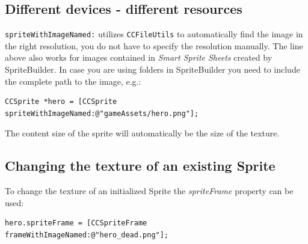 \subsection{Different devices - different resources}

\texttt{spriteWithImageNamed:} utilizes \texttt{CCFileUtils} to
automatically find the image in the right resolution, you do not have to
specify the resolution manually. The line above also works for images
contained in \emph{Smart Sprite Sheets} created by SpriteBuilder. In
case you are using folders in SpriteBuilder you need to include the
complete path to the image, e.g.:

\begin{verbatim}
CCSprite *hero = [CCSprite spriteWithImageNamed:@"gameAssets/hero.png"];
\end{verbatim}

The content size of the sprite will automatically be the size of the
texture.

\subsection{Changing the texture of an existing
Sprite}\label{changing-the-texture-of-an-existing-sprite}

To change the texture of an initialized Sprite the \emph{spriteFrame}
property can be used:

\begin{verbatim}
hero.spriteFrame = [CCSpriteFrame frameWithImageNamed:@"hero_dead.png"];
\end{verbatim}

